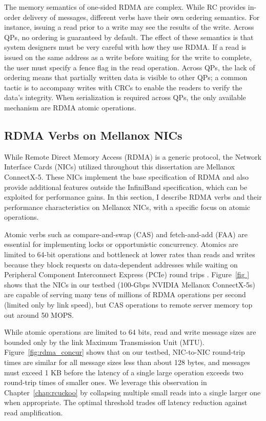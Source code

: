 \documentclass[12pt]{ucsddissertation}
\begin{document}
The memory semantics of one-sided RDMA are complex. While RC provides in-order delivery of messages,
different verbs have their own ordering semantics. For instance, issuing a read prior to a write may
see the results of the write. Across QPs, no ordering is guaranteed by default. The effect of these
semantics is that system designers must be very careful with how they use RDMA. If a read is issued
on the same address as a write before waiting for the write to complete, the user must specify a
fence flag in the read operation. Across QPs, the lack of ordering means that partially written data
is visible to other QPs; a common tactic is to accompany writes with CRCs to enable the readers to
verify the data's integrity. When serialization is required across QPs, the only available mechanism
are RDMA atomic operations.



\subsection{RDMA Verbs on Mellanox NICs}


While Remote Direct Memory Access (RDMA) is a generic protocol, the Network Interface Cards (NICs)
utilized throughout this dissertation are Mellanox ConnectX-5. These NICs implement the base
specification of RDMA and also provide additional features outside the InfiniBand specification,
which can be exploited for performance gains. In this section, I describe RDMA verbs and their
performance characteristics on Mellanox NICs, with a specific focus on atomic operations.

Atomic verbs such as compare-and-swap (CAS) and fetch-and-add (FAA) are essential for implementing
locks or opportunistic concurrency. Atomics are limited to 64-bit operations and bottleneck at lower
rates than reads and writes because they block requests on data-dependent addresses while waiting on
Peripheral Component Interconnect Express (PCIe) round trips \cite{design-guidelines,sherman}.
Figure~\ref{fig } shows that the NICs in our testbed (100-Gbps NVIDIA Mellanox ConnectX-5s) are
capable of serving many tens of millions of RDMA operations per second (limited only by link speed),
but CAS operations to remote server memory top out around 50 MOPS.

While atomic operations are limited to 64 bits, read and write message sizes are bounded only by the
link Maximum Transmission Unit (MTU). Figure~\ref{fig:rdma_concur} shows that on our testbed, NIC-to-NIC
round-trip times are similar for all message sizes less than about 128 bytes, and messages must
exceed 1 KB before the latency of a single large operation exceeds two round-trip times of smaller
ones. We leverage this observation in Chapter~\ref{chap:rcuckoo} by collapsing multiple small reads into a
single larger one when appropriate. The optimal threshold trades off latency reduction against read
amplification.
\end{document}
